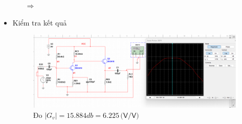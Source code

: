 \begin{itemize}[label=-]
\begin{itemize}[label=+, leftmargin=2cm]
		$\Rightarrow$ 
	\end{itemize}
	\item Kiểm tra kết quả
	
	\begin{figure}[H]
		\centering
		\includegraphics[width=.8\linewidth]{./my-chapters/my-images/Question9/d_result.png}
		\caption{Đo $|G_{v}| = 15.884db = 6.225 \,\textsf{(V/V)}$}
	\end{figure}
\end{itemize}
